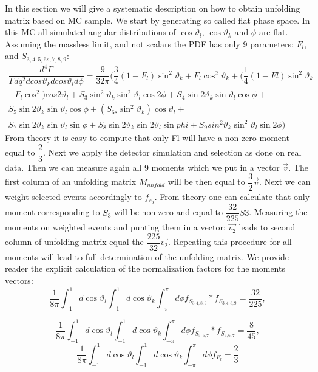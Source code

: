 \documentclass[aps,prd,reprint,nofootinbib,preprintnumbers]{revtex4}
\renewcommand{\theta}{\vartheta}
\begin{document}
In this section we will give a systematic description on how to obtain unfolding matrix based on MC sample. We start by generating so called flat phase space. In this MC all simulated angular distributions of $\cos \theta_l$, $\cos \theta_k$ and $\phi$ are flat. Assuming the massless limit, and not scalars the PDF has only 9 parameters: $F_l$, and $S_{3,4,5,6s,7,8,9}$:
\begin{multline}
\dfrac{d^4\Gamma}{ \Gamma dq^2 dcos\theta_k dcos\theta_l d\phi}=\dfrac{9}{32\pi}( \dfrac{3}{4} (1-F_l) \sin^2 \theta_k + F_l\cos^2 \theta_k + ( \dfrac{1}{4}(1-Fl)\sin^2 \theta_k \\ -  F_l\cos^2) cos 2\theta_l  + S_3 \sin^2 \theta_k \sin^2 \theta_l \cos2\phi + S_4 \sin2 \theta_k \sin \theta_l \cos\phi +\\ S_5 \sin2 \theta_k \sin \theta_l \cos \phi +  (S_{6s} \sin^2 \theta_k) \cos \theta_l + \\ S_7 \sin 2\theta_k \sin \theta_l \sin \phi +  S_8 \sin 2 \theta_k \sin 2 \theta_l \sin phi + S_9 sin^2 \theta_k \sin^2 \theta_l \sin 2 \phi)
\label{PDF}
\end{multline}
From theory it is easy to compute that only Fl will have a non zero moment equal to $\dfrac{2}{3}$. Next we apply the detector simulation and selection as done on real data. Then we can measure again all 9 moments which we put in a vector $\overrightarrow{v}$. The first column of an unfolding matrix $M_{unfold}$ will be then equal to $\dfrac{3}{2} \overrightarrow{v}$. Next we can weight selected events accordingly to $f_{s_3}$. From theory one can calculate that only moment corresponding to $S_3$ will be non zero and equal to $\dfrac{32}{225} S3$. Measuring the moments on weighted events and punting them in a vector: $\overrightarrow{v_2}$ leads to second column of unfolding matrix equal the $\dfrac{225}{32} \overrightarrow{v_2}$. Repeating this procedure for all moments will lead to full determination of the unfolding matrix. We provide reader the explicit calculation of the normalization factors for the moments vectors:
\begin{equation}
\dfrac{1}{8\pi} \int_{-1}^{1} d\cos \theta_l \int_{-1}^{1} d\cos \theta_k  \int_{-\pi}^{\pi} d\phi f_{S_{3,4,8,9}}*f_{S_{3,4,8,9}}= \dfrac{32}{225} ,
\end{equation}

\begin{equation}
\dfrac{1}{8\pi} \int_{-1}^{1} d\cos \theta_l \int_{-1}^{1} d\cos \theta_k  \int_{-\pi}^{\pi} d\phi f_{S_{5,6,7}}*f_{S_{5,6,7}}= \dfrac{8}{45} ,
\end{equation}
\begin{equation}
\dfrac{1}{8\pi} \int_{-1}^{1} d\cos \theta_l \int_{-1}^{1} d\cos \theta_k  \int_{-\pi}^{\pi} d\phi f_{F_l}= \dfrac{2}{3} 
\end{equation}
\end{document}
